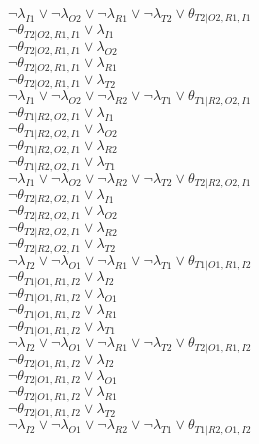 $\neg\lambda_{I1} \vee \neg\lambda_{O2} \vee \neg\lambda_{R1} \vee \neg\lambda_{T2} \vee \theta_{T2|O2,R1,I1}$\\
$\neg\theta_{T2|O2,R1,I1} \vee \lambda_{I1}$\\
$\neg\theta_{T2|O2,R1,I1} \vee \lambda_{O2}$\\
$\neg\theta_{T2|O2,R1,I1} \vee \lambda_{R1}$\\
$\neg\theta_{T2|O2,R1,I1} \vee \lambda_{T2}$\\
$\neg\lambda_{I1} \vee \neg\lambda_{O2} \vee \neg\lambda_{R2} \vee \neg\lambda_{T1} \vee \theta_{T1|R2,O2,I1}$\\
$\neg\theta_{T1|R2,O2,I1} \vee \lambda_{I1}$\\
$\neg\theta_{T1|R2,O2,I1} \vee \lambda_{O2}$\\
$\neg\theta_{T1|R2,O2,I1} \vee \lambda_{R2}$\\
$\neg\theta_{T1|R2,O2,I1} \vee \lambda_{T1}$\\
$\neg\lambda_{I1} \vee \neg\lambda_{O2} \vee \neg\lambda_{R2} \vee \neg\lambda_{T2} \vee \theta_{T2|R2,O2,I1}$\\
$\neg\theta_{T2|R2,O2,I1} \vee \lambda_{I1}$\\
$\neg\theta_{T2|R2,O2,I1} \vee \lambda_{O2}$\\
$\neg\theta_{T2|R2,O2,I1} \vee \lambda_{R2}$\\
$\neg\theta_{T2|R2,O2,I1} \vee \lambda_{T2}$\\
$\neg\lambda_{I2} \vee \neg\lambda_{O1} \vee \neg\lambda_{R1} \vee \neg\lambda_{T1} \vee \theta_{T1|O1,R1,I2}$\\
$\neg\theta_{T1|O1,R1,I2} \vee \lambda_{I2}$\\
$\neg\theta_{T1|O1,R1,I2} \vee \lambda_{O1}$\\
$\neg\theta_{T1|O1,R1,I2} \vee \lambda_{R1}$\\
$\neg\theta_{T1|O1,R1,I2} \vee \lambda_{T1}$\\
$\neg\lambda_{I2} \vee \neg\lambda_{O1} \vee \neg\lambda_{R1} \vee \neg\lambda_{T2} \vee \theta_{T2|O1,R1,I2}$\\
$\neg\theta_{T2|O1,R1,I2} \vee \lambda_{I2}$\\
$\neg\theta_{T2|O1,R1,I2} \vee \lambda_{O1}$\\
$\neg\theta_{T2|O1,R1,I2} \vee \lambda_{R1}$\\
$\neg\theta_{T2|O1,R1,I2} \vee \lambda_{T2}$\\
$\neg\lambda_{I2} \vee \neg\lambda_{O1} \vee \neg\lambda_{R2} \vee \neg\lambda_{T1} \vee \theta_{T1|R2,O1,I2}$\\
